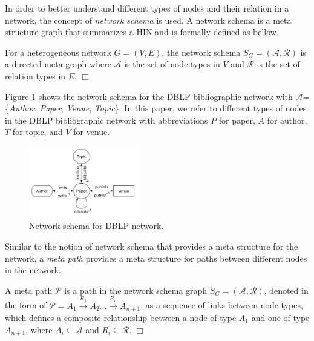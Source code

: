 In order to better understand different types of nodes and their relation in a network, the concept of \textit{network schema} \cite{sun2011pathsim} is used. A network schema is a meta structure graph that summarizes a HIN and is formally defined as bellow.

\begin{definition}
For a heterogeneous network $G=(V,E)$, the network schema $S_G=\mathcal{(A,R)}$ is a directed meta graph where $\mathcal{A}$ is the set of node types in $V$ and $\mathcal{R}$ is the set of relation types in $E$.  $\Box$
\end{definition}

Figure \ref{schema} shows the network schema for the DBLP bibliographic network with $\mathcal{A}$=\{\textit{Author}, \textit{Paper}, \textit{Venue}, \textit{Topic}\}. %
In this paper, we refer to different types of nodes in the DBLP bibliographic network with abbreviations $P$ for paper, $A$ for author, $T$ for topic, and $V$ for venue. 

\begin{figure}[t]
  \centering
      \includegraphics[trim = 0mm 10mm 0mm 0mm,width=0.42\textwidth]{figs/schema.pdf}
  \caption{Network schema for DBLP network.}\label{schema}
\end{figure}


Similar to the notion of network schema that provides a meta structure for the network, a \textit{meta path} \cite{sun2011pathsim} provides a meta structure for paths between different nodes in the network. 

\begin{definition}
A meta path $\mathcal{P}$ is a path in the network schema graph $S_G = (\mathcal{A,R})$, denoted in the form of $\mathcal{P} = A_1 \xrightarrow{R_1} A_2... \xrightarrow{R_n} A_{n+1}$, as a sequence of links between node types, which defines a composite relationship between a node of type $A_1$ and one of type $A_{n+1}$, where $A_i \subseteq \mathcal{A}$ and $R_i \subseteq \mathcal{R}$. $\Box$
\end{definition}



